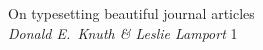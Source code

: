 \documentclass[prelims]{jciartcl}
\begin{document}
\maketitle

\makecontents

\begin{contents}
	\item On typesetting beautiful journal articles\\
		\textit{Donald E.\ Knuth \& Leslie Lamport}
		\hfill 1
\end{contents}
\end{document}
